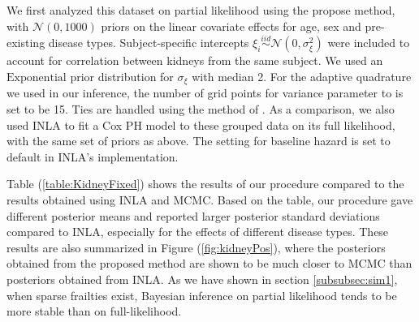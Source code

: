 \documentclass[ba]{imsart}
\begin{document}
We first analyzed this dataset on partial likelihood using the propose method, with $\mathcal{N}(0, 1000)$ priors on the linear covariate effects for age, sex and pre-existing disease types. Subject-specific intercepts $\xi_{i}\overset{iid}{\sim}\mathcal{N}(0,\sigma^{2}_{\xi})$ were included to account for correlation between kidneys from the same subject. We used an $\text{Exponential}$ prior distribution for $\sigma_{\xi}$ with median 2. For the adaptive quadrature we used in our inference, the number of grid points for variance parameter to is set to be 15. Ties are handled using the method of \cite{Breslow}.
As a comparison, we also used INLA to fit a Cox PH model to these grouped data on its full likelihood, with the same set of priors as above. The setting for baseline hazard is set to default in INLA's implementation.

Table (\ref{table:KidneyFixed}) shows the results of our procedure compared to the results obtained using INLA and MCMC. Based on the table, our procedure gave different posterior means and reported larger posterior standard deviations compared to INLA, especially for the effects of different disease types. These results are also summarized in Figure (\ref{fig:kidneyPos}), where the posteriors obtained from the proposed method are shown to be much closer to MCMC than posteriors obtained from INLA. As we have shown in section \ref{subsubsec:sim1}, when sparse frailties exist, Bayesian inference on partial likelihood tends to be more stable than on full-likelihood. 

\begin{table}[h]
  \begin{center}
  \end{center}
  \caption{Estimated means and standard deviations of linear effects by proposed method, INLA and MCMC for the kidney data in section \ref{subsec:kidney}. }
  \label{table:KidneyFixed}
  \end{table}
  
\end{document}
